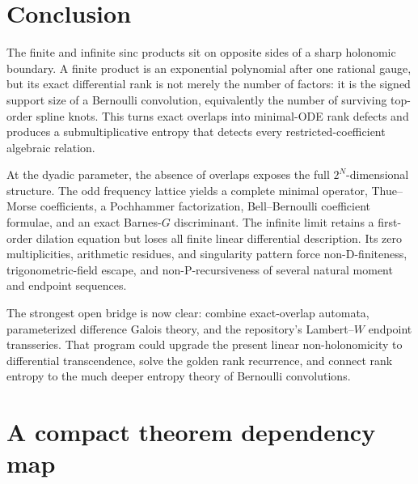 \documentclass[11pt]{article}
\numberwithin{equation}{section}
\theoremstyle{definition}
\theoremstyle{remark}
\begin{document}
\section{Conclusion}
\label{sec:conclusion}

The finite and infinite sinc products sit on opposite sides of a sharp
holonomic boundary.  A finite product is an exponential polynomial after one
rational gauge, but its exact differential rank is not merely the number of
factors: it is the signed support size of a Bernoulli convolution, equivalently
the number of surviving top-order spline knots.  This turns exact overlaps
into minimal-ODE rank defects and produces a submultiplicative entropy that
detects every restricted-coefficient algebraic relation.

At the dyadic parameter, the absence of overlaps exposes the full
$2^N$-dimensional structure.  The odd frequency lattice yields a complete
minimal operator, Thue--Morse coefficients, a Pochhammer factorization,
Bell--Bernoulli coefficient formulae, and an exact Barnes-$G$ discriminant.
The infinite limit retains a first-order dilation equation but loses all finite
linear differential description.  Its zero multiplicities, arithmetic
residues, and singularity pattern force non-D-finiteness, trigonometric-field
escape, and non-P-recursiveness of several natural moment and endpoint
sequences.

The strongest open bridge is now clear: combine exact-overlap automata,
parameterized difference Galois theory, and the repository's Lambert--$W$
endpoint transseries.  That program could upgrade the present linear
non-holonomicity to differential transcendence, solve the golden rank
recurrence, and connect rank entropy to the much deeper entropy theory of
Bernoulli convolutions.

\appendix

\section{A compact theorem dependency map}
\label{app:dependency}
\end{document}
